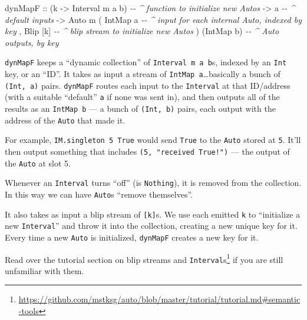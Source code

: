 \documentclass[]{article}
\newenvironment{Shaded}{}{}
\newcommand{\CommentTok}[1]{\textcolor[rgb]{0.38,0.63,0.69}{\textit{#1}}}
\newcommand{\DataTypeTok}[1]{\textcolor[rgb]{0.56,0.13,0.00}{#1}}
\newcommand{\NormalTok}[1]{#1}
\newcommand{\OtherTok}[1]{\textcolor[rgb]{0.00,0.44,0.13}{#1}}
\renewcommand{\href}[2]{#2\footnote{\url{#1}}}
\begin{document}
\begin{Shaded}
\begin{Highlighting}[]
\OtherTok{dynMapF ::}\NormalTok{ (k }\OtherTok{{-}\textgreater{}} \DataTypeTok{Interval}\NormalTok{ m a b)    }\CommentTok{{-}{-} \^{} function to initialize new \textasciigrave{}Auto\textasciigrave{}s}
        \OtherTok{{-}\textgreater{}}\NormalTok{ a                        }\CommentTok{{-}{-} \^{} default inputs}
        \OtherTok{{-}\textgreater{}} \DataTypeTok{Auto}\NormalTok{ m ( }\DataTypeTok{IntMap}\NormalTok{ a        }\CommentTok{{-}{-} \^{} input for each internal \textasciigrave{}Auto\textasciigrave{}, indexed by key}
\NormalTok{                  , }\DataTypeTok{Blip}\NormalTok{ [k]        }\CommentTok{{-}{-} \^{} blip stream to initialize new \textasciigrave{}Auto\textasciigrave{}s}
\NormalTok{                  )}
\NormalTok{                  (}\DataTypeTok{IntMap}\NormalTok{ b)        }\CommentTok{{-}{-} \^{} \textasciigrave{}Auto\textasciigrave{} outputs, by key}
\end{Highlighting}
\end{Shaded}

\texttt{dynMapF} keeps a ``dynamic collection'' of \texttt{Interval\ m\ a\ b}s,
indexed by an \texttt{Int} key, or an ``ID''. It takes as input a stream of
\texttt{IntMap\ a}\ldots basically a bunch of \texttt{(Int,\ a)} pairs.
\texttt{dynMapF} routes each input to the \texttt{Interval} at that ID/address
(with a suitable ``default'' \texttt{a} if none was sent in), and then outputs
all of the results as an \texttt{IntMap\ b} --- a bunch of \texttt{(Int,\ b)}
pairs, each output with the address of the \texttt{Auto} that made it.

For example, \texttt{IM.singleton\ 5\ True} would send \texttt{True} to the
\texttt{Auto} stored at \texttt{5}. It'll then output something that includes
\texttt{(5,\ "received\ True!")} --- the output of the \texttt{Auto} at slot 5.

Whenever an \texttt{Interval} turns ``off'' (is \texttt{Nothing}), it is removed
from the collection. In this way we can have \texttt{Auto}s ``remove
themselves''.

It also takes as input a blip stream of \texttt{{[}k{]}}s. We use each emitted
\texttt{k} to ``initialize a new \texttt{Interval}'' and throw it into the
collection, creating a new unique key for it. Every time a new \texttt{Auto} is
initialized, \texttt{dynMapF} creates a new key for it.

Read over the
\href{https://github.com/mstksg/auto/blob/master/tutorial/tutorial.md\#semantic-tools}{tutorial
section on blip streams and \texttt{Interval}s} if you are still unfamiliar with
them.
\end{document}
